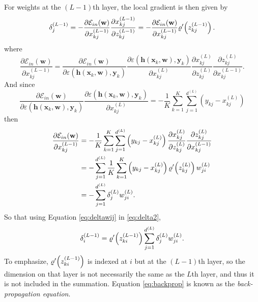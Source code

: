 For weights at the $(L-1)$th layer, the local gradient is then given by
\begin{equation}\label{eq:delta2}
\delta_{j}^{(L-1)}=-\frac{\partial \mathcal{E}_{in}(\mathbf{w})}{\partial x_{kj}^{(L-1)}}\frac{\partial x_{kj}^{(L-1)}}{\partial z_{kj}^{(L-1)}}=-\frac{\partial \mathcal{E}_{in}(\mathbf{w})}{\partial x_{kj}^{(L-1)}}\varrho'\!\left(z_{kj}^{(L-1)}\right).
\end{equation}
where
\begin{equation}
\frac{\partial \mathcal{E}_{in}(\mathbf{w})}{\partial x_{kj}^{(L-1)}}=\frac{\partial \mathcal{E}_{in}(\mathbf{w})}{\partial \varepsilon(\mathbf{h}(\mathbf{x}_k,\mathbf{w}),\mathbf{y}_{k})}\frac{\partial \varepsilon(\mathbf{h}(\mathbf{x}_k,\mathbf{w}),\mathbf{y}_{k})}{\partial x_{kj}^{(L)}}\frac{\partial x_{kj}^{(L)}}{\partial z_{kj}^{(L)}}\frac{\partial z_{kj}^{(L)}}{\partial x_{kj}^{(L-1)}}.
\end{equation}
And since
\begin{equation}
\frac{\partial \mathcal{E}_{in}(\mathbf{w})}{\partial \varepsilon(\mathbf{h}(\mathbf{x}_k,\mathbf{w}),\mathbf{y}_{k})}\frac{\partial \varepsilon(\mathbf{h}(\mathbf{x}_k,\mathbf{w}),\mathbf{y}_{k})}{\partial x_{kj}^{(L)}}=-\frac{1}{K}\sum_{k=1}^{K}\sum_{j=1}^{d^{(L)}}\left(y_{kj}-x_{kj}^{(L)}\right)
\end{equation}
then
\begin{align}
\frac{\partial \mathcal{E}_{in}(\mathbf{w})}{\partial x_{kj}^{(L-1)}}&=-\frac{1}{K}\sum_{k=1}^{K}\sum_{j=1}^{d^{(L)}}\left(y_{kj}-x_{kj}^{(L)}\right)\frac{\partial x_{kj}^{(L)}}{\partial z_{kj}^{(L)}}\frac{\partial z_{kj}^{(L)}}{\partial x_{kj}^{(L-1)}}\nonumber\\
&=-\sum_{j=1}^{d^{(L)}}\frac{1}{K}\sum_{k=1}^{K}\left(y_{kj}-x_{kj}^{(L)}\right)\varrho'\!\left(z_{kj}^{(L)}\right)w_{ji}^{(L)}\nonumber\\
&=-\sum_{j=1}^{d^{(L)}}\delta_j^{(L)}w_{ji}^{(L)}.\label{eq:deltawij}
\end{align}
So that using Equation \ref{eq:deltawij} in \ref{eq:delta2},
\begin{equation}\label{eq:backprop}
\delta_{i}^{(L-1)}=\varrho'\!\left(z_{ki}^{(L-1)}\right)\sum_{j=1}^{d^{(L)}}\delta_j^{(L)}w_{ji}^{(L)}.
\end{equation}
To emphasize, $\varrho'\!\left(z_{ki}^{(L-1)}\right)$ is indexed at $i$ but at the $(L-1)$th layer, so the dimension on that layer is not necessarily the same as the $L$th layer, and thus it is not included in the summation. Equation \ref{eq:backprop} is known as the \textit{back-propagation equation}.

